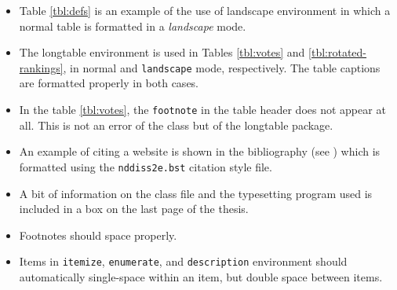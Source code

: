 \documentclass[final,numrefs,sort&compress,twoadvisors]{nddiss2e}
\begin{document}
\begin{itemize}
\item Table \ref{tbl:defs} is an example of the use of \textsf{landscape}
environment in which a normal table is formatted in a \emph{landscape} mode.
\item The \textsf{longtable} environment is used in Tables \ref{tbl:votes} and
\ref{tbl:rotated-rankings}, in normal and \verb+landscape+ mode, respectively. The
table captions are formatted properly in both cases.
\item In the table \ref{tbl:votes}, the \verb+footnote+ in the table header 
does not appear at all. This is not an error of the \nddiss\/ class but of the
\textsf{longtable} package.
\item An example of citing a website is shown in the bibliography (see
\citep{gairley2000}) which is formatted using the \verb+nddiss2e.bst+
citation style file.
\item A bit of information on the \nddiss\/ class file and the typesetting program
used is included in a box on the last page of the thesis.
\item Footnotes should space properly.
\item Items in \verb+itemize+, \verb+enumerate+, and \verb+description+ environment
should automatically single-space within an item, but double space between items.
\end{itemize}

%
%




%
%




%
%

\appendix




%
%

\end{document}
